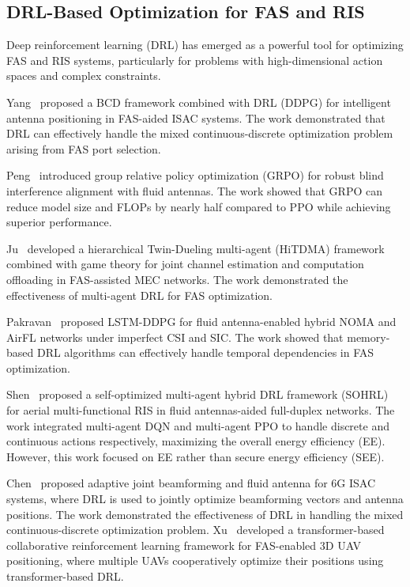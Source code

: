 \subsection{DRL-Based Optimization for FAS and RIS}

Deep reinforcement learning (DRL) has emerged as a powerful tool for optimizing FAS and RIS systems, particularly for problems with high-dimensional action spaces and complex constraints.

Yang~\cite{yang2025intelligent} proposed a BCD framework combined with DRL (DDPG) for intelligent antenna positioning in FAS-aided ISAC systems. The work demonstrated that DRL can effectively handle the mixed continuous-discrete optimization problem arising from FAS port selection.

Peng~\cite{peng2026grpo} introduced group relative policy optimization (GRPO) for robust blind interference alignment with fluid antennas. The work showed that GRPO can reduce model size and FLOPs by nearly half compared to PPO while achieving superior performance.

Ju~\cite{ju2025joint} developed a hierarchical Twin-Dueling multi-agent (HiTDMA) framework combined with game theory for joint channel estimation and computation offloading in FAS-assisted MEC networks. The work demonstrated the effectiveness of multi-agent DRL for FAS optimization.

Pakravan~\cite{pakravan2026hybrid} proposed LSTM-DDPG for fluid antenna-enabled hybrid NOMA and AirFL networks under imperfect CSI and SIC. The work showed that memory-based DRL algorithms can effectively handle temporal dependencies in FAS optimization.

Shen~\cite{shen2026mf} proposed a self-optimized multi-agent hybrid DRL framework (SOHRL) for aerial multi-functional RIS in fluid antennas-aided full-duplex networks. The work integrated multi-agent DQN and multi-agent PPO to handle discrete and continuous actions respectively, maximizing the overall energy efficiency (EE). However, this work focused on EE rather than secure energy efficiency (SEE).

Chen~\cite{chen2026adaptive} proposed adaptive joint beamforming and fluid antenna for 6G ISAC systems, where DRL is used to jointly optimize beamforming vectors and antenna positions. The work demonstrated the effectiveness of DRL in handling the mixed continuous-discrete optimization problem. Xu~\cite{xu2025transformer} developed a transformer-based collaborative reinforcement learning framework for FAS-enabled 3D UAV positioning, where multiple UAVs cooperatively optimize their positions using transformer-based DRL.


